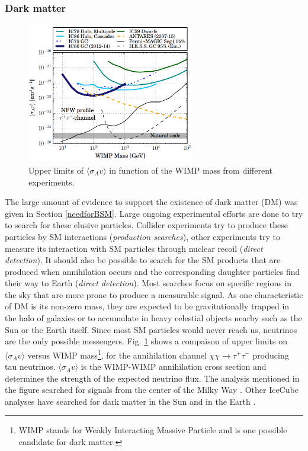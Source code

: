 \subsubsection{Dark matter}
\label{subsubsec:DM}

\begin{figure}[ht]
\centering
\includegraphics[width=0.65\textwidth]{chapter5/img/dm.png}
\caption{Upper limits of $\langle \sigma_A v\rangle$ in function of the WIMP mass from different experiments.}
\label{fig:dm}
\end{figure}

The large amount of evidence to support the existence of dark matter (DM) was given in Section \ref{needforBSM}. Large ongoing experimental efforts are done to try to search for these elusive particles. Collider experiments try to produce these particles by SM interactions (\textit{production searches}), other experiments try to measure its interaction with SM particles through nuclear recoil (\textit{direct detection}). It should also be possible to search for the SM products that are produced when annihilation occurs and the corresponding daughter particles find their way to Earth (\textit{direct detection}). Most searches focus on specific regions in the sky that are more prone to produce a measurable signal. As one characteristic of DM is its non-zero mass, they are expected to be gravitationally trapped in the halo of galaxies or to accumulate in heavy celestial objects nearby such as the Sun or the Earth itself. Since most SM particles would never reach us, neutrinos are the only possible messengers. Fig. \ref{fig:dm} shows a compaison of upper limits on $\langle \sigma_A v\rangle$ versus WIMP mass\footnote{WIMP stands for Weakly Interacting Massive Particle and is one possible candidate for dark matter.}, for the annihilation channel $\chi \chi \rightarrow \tau^+ \tau^-$ producing tau neutrinos. $\langle \sigma_A v\rangle$ is the WIMP-WIMP annihilation cross section and determines the strength of the expected neutrino flux. The analysis mentioned in the figure searched for signals from the center of the Milky Way \cite{Aartsen:2017ulx}. Other IceCube analyses have searched for dark matter in the Sun \cite{Aartsen:2016zhm,Abbasi:2009vg} and in the Earth \cite{Aartsen:2016fep}.

